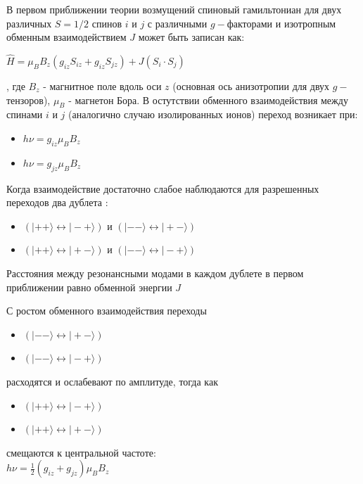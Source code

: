 \documentclass[11pt]{article}
\begin{document}
В первом приближении теории возмущений спиновый гамильтониан для двух различных $S=1/2$ спинов $i$ и $j$ с различными $g-$факторами и изотропным обменным взаимодействием $J$ может быть записан как:

$\hat H = \mu_BB_z(g_{iz}S_{iz} + g_{iz}S_{jz})+ J(S_i \cdot S_j) $

, где $B_z$ - магнитное поле вдоль оси $z$ (основная ось анизотропии для двух $g-$тензоров),  $\mu_B $ - магнетон Бора. В остутствии обменного взаимодействия между спинами $i$ и $j$ (аналогично случаю изолированных ионов) переход возникает при: 

\begin{itemize} 
\item $h\nu = g_{iz}\mu_BB_z $ 
\item $h\nu = g_{jz}\mu_BB_z $ \\
\end{itemize} 

Когда взаимодействие достаточно слабое наблюдаются для разрешенных переходов два дублета :
\begin{itemize} 
\item $(|++\rangle \leftrightarrow |-+\rangle)$ и $(|--\rangle \leftrightarrow |+-\rangle)$
\item $(|++\rangle \leftrightarrow |+-\rangle)$ и $(|--\rangle \leftrightarrow |-+\rangle)$
\end{itemize} 

Расстояния между резонансными модами в каждом дублете в первом приближении равно обменной энергии $J$

С ростом обменного взаимодействия переходы
\begin{itemize} 
\item $(|--\rangle \leftrightarrow |+-\rangle)$
\item $(|--\rangle \leftrightarrow |-+\rangle)$
\end{itemize} 

расходятся и ослабевают по амплитуде, тогда как

\begin{itemize} 
\item $(|++\rangle \leftrightarrow |-+\rangle)$
\item $(|++\rangle \leftrightarrow |+-\rangle)$
\end{itemize} 

смещаются к центральной частоте: \\

$h\nu = \frac{1}{2}(g_{iz}+g_{jz})\mu_BB_z$ \\
\end{document}
